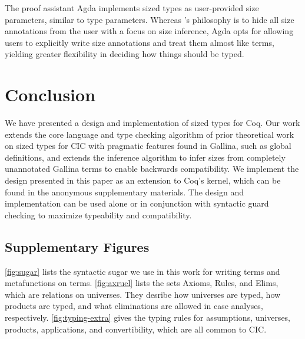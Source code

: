 \documentclass[sigplan,10pt,anonymous,review]{acmart}
\newcommand{\inmaterials}{in the anonymous supplementary materials}
\begin{document}
The proof assistant Agda implements sized types as user-provided size parameters, similar to type parameters. Whereas \CIChat$ $'s philosophy is to hide all size annotations from the user with a focus on size inference, Agda opts for allowing users to explicitly write size annotations and treat them almost like terms, yielding greater flexibility in deciding how things should be typed.

\section{Conclusion}
\label{sec:conclusion}
We have presented a design and implementation of sized types for Coq.
Our work extends the core language and type checking algorithm of prior
theoretical work on sized types for CIC with pragmatic features found in
Gallina, such as global definitions, and extends the inference algorithm to
infer sizes from completely unannotated Gallina terms to enable backwards
compatibility.
We implement the design presented in this paper as an extension to Coq's kernel,
which can be found \inmaterials.
The design and implementation can be used alone or in conjunction with syntactic
guard checking to maximize typeability and compatibility.

\clearpage




\begin{samepage}
\begin{appendices}




\FigExtra[!th]
\FloatBarrier
\FigSugar[t]
\FigPTSSets[t]

\section{Supplementary Figures}\label{figures}

\autoref{fig:sugar} lists the syntactic sugar we use in this work for writing terms and metafunctions on terms. \autoref{fig:axruel} lists the sets Axioms, Rules, and Elims, which are relations on universes. They desribe how universes are typed, how products are typed, and what eliminations are allowed in case analyses, respectively. \autoref{fig:typing-extra} gives the typing rules for assumptions, universes, products, applications, and convertibility, which are all common to CIC.

\FloatBarrier
\end{appendices}
\end{samepage}
\end{document}
